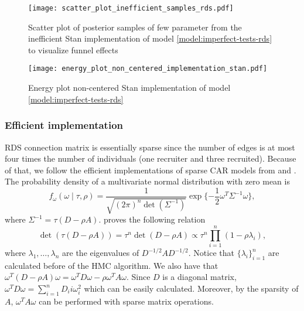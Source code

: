 \begin{figure}[htb]
  \centering
  \caption{\label{fig:scatter_plot_inefficient_samples_rds}Scatter plot
    of posterior samples of few parameter from the inefficient Stan implementation of model
    \eqref{model:imperfect-tests-rds} to visualize funnel effects}
  \texttt{[image: scatter\_plot\_inefficient\_samples\_rds.pdf]}
\end{figure}

\begin{figure}[htb]
  \centering
  \caption{\label{fig:energy_plot_non_centered_implementation_stan}Energy plot
    non-centered Stan implementation of model \eqref{model:imperfect-tests-rds}}
  \texttt{[image: energy\_plot\_non\_centered\_implementation\_stan.pdf]}
\end{figure}

\subsubsection*{Efficient implementation}

RDS connection matrix is essentially sparse since the number of edges is at
most four times the number of individuals (one recruiter and three
recruited). Because of that, we follow the efficient implementations of sparse
CAR models
from \textcite{donegan2021spatial} and \textcite{exactcar}. The probability
density of a multivariate normal distribution with zero mean is
\begin{equation}
  \label{eq:multivariate_normal}
  f_{\omega}(\omega \mid \tau, \rho) = \frac{1}{\sqrt{(2\pi)^n\det(\Sigma^{-1})}
  }\exp\{-\frac{1}{2}\omega^T\Sigma^{-1}\omega\},
\end{equation}
where $\Sigma^{-1} = \tau(D - \rho A)$. \textcite[p. 955]{jin2005generalized}
proves the following relation
$$
  \det(\tau(D - \rho A)) = \tau^n \det(D - \rho A) \propto \tau^n \prod_{i=1}^n (1 - \rho \lambda_i),
$$
where $\lambda_1, \dots, \lambda_n$ are the eigenvalues of $D^{-1/2} A
  D^{-1/2}$. Notice that $\{\lambda_i\}_{i=1}^n$ are calculated before of the
HMC algorithm. We also have that $\omega^T(D - \rho A)\omega = \omega^T D \omega - \rho \omega^T A
  \omega$. Since $D$ is a diagonal matrix, $\omega^T D \omega = \sum_{i=1}^n
  D_ii\omega_i^2$ which can be easily calculated. Moreover, by the sparsity of $A$,
$\omega^T A \omega$ can be performed with sparse matrix operations.

